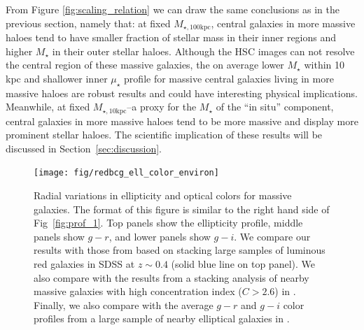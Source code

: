 \documentclass[a4paper,fleqn,usenatbib]{mnras}
\def\mstar{{$M_{\star}$}}
\def\minn{{$M_{\star,10\mathrm{kpc}}$}}
\def\mtot{{$M_{\star,100\mathrm{kpc}}$}}
\def\mden{{$\mu_{\star}$}}
\begin{document}
    From Figure \ref{fig:scaling_relation} we can draw the same conclusions as in 
    the previous section, namely that: 
    at fixed \mtot{}, central galaxies in more massive haloes tend to have smaller 
    fraction of stellar mass in their inner regions and higher \mstar{} in their outer
    stellar haloes. 
    Although the HSC images can not resolve the central region of these massive 
    galaxies, the on average lower \mstar{} within 10 kpc and shallower inner \mden{} 
    profile for massive central galaxies living in more massive haloes are robust 
    results and could have interesting physical implications.
    Meanwhile, at fixed \minn{}--a proxy for the \mstar{} of the ``in situ'' component,
    central galaxies in more massive haloes tend to be more massive and display more 
    prominent stellar haloes. 
    The scientific implication of these results will be discussed in 
    Section~\ref{sec:discussion}.
     

  \begin{figure}
      \centering 
      \texttt{[image: fig/redbcg\_ell\_color\_environ]}
      \caption{
          Radial variations in ellipticity and optical colors for massive galaxies. 
          The format of this figure is similar to the right hand side of 
          Fig~\ref{fig:prof_1}. 
          Top panels show the ellipticity profile, middle panels show $g-r$, and lower 
          panels show $g-i$. 
          We compare our results with those from \citet{Tal2011} based on stacking 
          large samples of luminous red galaxies in SDSS at $z{\sim} 0.4$ 
          (solid blue line on top panel). 
          We also compare with the results from a stacking analysis of nearby massive 
          galaxies with high concentration index ($C>2.6$) in 
          \citet[][blue dash lines on the top and middle panels]{DSouza2014}. 
          Finally, we also compare with the average $g-r$ and $g-i$ color profiles 
          from a large sample of nearby elliptical galaxies in \citet[][blue, solid 
          lines on the middle and bottom panels]{LaBarbera2010}.
          }
      \label{fig:ell_color}
  \end{figure}


\end{document}
